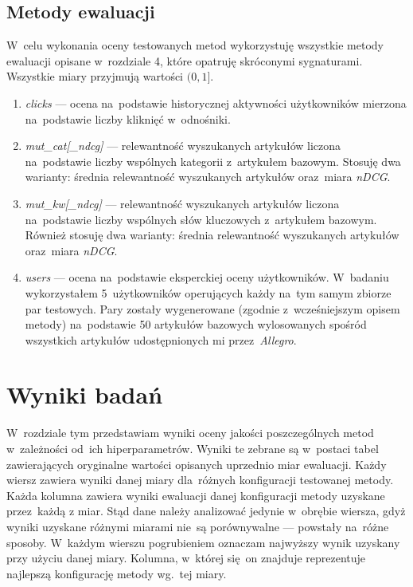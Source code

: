 \documentclass[pl]{minipw} %
\begin{document}
\section{Metody ewaluacji}

W~celu wykonania oceny testowanych metod wykorzystuję wszystkie metody ewaluacji opisane w~rozdziale 4, które opatruję skróconymi sygnaturami. Wszystkie miary przyjmują wartości $(0,1]$.
\begin{enumerate}
	\item \textit{clicks} --- ocena na~podstawie historycznej aktywności użytkowników mierzona na~podstawie liczby kliknięć w~odnośniki.
	\item \textit{mut\_cat[\_ndcg]} --- relewantność wyszukanych artykułów liczona na~podstawie liczby wspólnych kategorii z~artykułem bazowym. Stosuję dwa warianty: średnia relewantność wyszukanych artykułów oraz~miara \textit{nDCG}.
	\item \textit{mut\_kw[\_ndcg]} --- relewantność wyszukanych artykułów liczona na~podstawie liczby wspólnych słów kluczowych z~artykułem bazowym. Również stosuję dwa warianty: średnia relewantność wyszukanych artykułów oraz~miara \textit{nDCG}.
	\item \textit{users} --- ocena na~podstawie eksperckiej oceny użytkowników. W~badaniu wykorzystałem 5~użytkowników operujących każdy na~tym samym zbiorze par testowych. Pary zostały wygenerowane (zgodnie z~wcześniejszym opisem metody) na~podstawie 50 artykułów bazowych wylosowanych spośród wszystkich artykułów udostępnionych mi przez~\textit{Allegro}.
\end{enumerate}

\chapter{Wyniki badań}
W~rozdziale tym przedstawiam wyniki oceny jakości poszczególnych metod w~zależności od~ich hiperparametrów. Wyniki te zebrane są w~postaci tabel zawierających oryginalne wartości opisanych uprzednio miar ewaluacji. Każdy wiersz zawiera wyniki danej miary dla~różnych konfiguracji testowanej metody. Każda kolumna zawiera wyniki ewaluacji danej konfiguracji metody uzyskane przez~każdą z miar. Stąd dane należy analizować jedynie w~obrębie wiersza, gdyż wyniki uzyskane różnymi miarami nie~są porównywalne --- powstały na~różne sposoby. W~każdym wierszu pogrubieniem oznaczam najwyższy wynik uzyskany przy użyciu danej miary. Kolumna, w~której się on znajduje reprezentuje najlepszą konfigurację metody wg.~tej miary.
\end{document}
